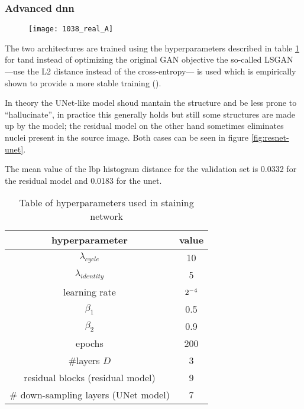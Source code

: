 \documentclass[../main.tex]{subfiles}
\begin{document}
\subsubsection{Advanced \gls{dnn}}

\begin{figure}
\centering
\texttt{[image: 1038\_real\_A]}
\caption{}
\label{}
\end{figure}

The two architectures are trained using the hyperparameters described
in table \ref{tab:hyperparameters} 
for tand instead of optimizing the
original GAN objective
the so-called LSGAN ---use the L2 distance instead of the cross-entropy---
is used which is empirically shown to provide a more
stable training (\cite{lsgan}).

In theory the UNet-like model shoud mantain the structure and be less prone
to ``hallucinate'', in practice this generally holds but still some structures
are made up by the model; the residual model on the other hand sometimes
eliminates nuclei present in the source image. Both cases can be seen in figure
\ref{fig:resnet-unet}.

The mean value of the \gls{lbp} histogram distance for the validation
set is 0.0332 for the residual model and 0.0183 for the unet.

\begin{table}
\centering
\begin{tabular}{cc}
\toprule
hyperparameter & value \\
\midrule
$\lambda_{cycle}$ & 10 \\
$\lambda_{identity}$ & 5 \\
learning rate & $2 \time 10^{-4}$ \\
$\beta_1$ & 0.5 \\
$\beta_2$ & 0.9 \\
epochs & 200 \\
\#layers $D$ & 3 \\
residual blocks (residual model) & 9 \\
\# down-sampling layers (UNet model) & 7 \\
\bottomrule
\end{tabular}
\caption{Table of hyperparameters used in staining network}
\label{tab:hyperparameters}
\end{table}
\end{document}
